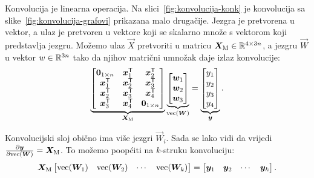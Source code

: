 \documentclass[utf8, diplomski, lmodern]{fer}
\begin{document}
Konvolucija je linearna operacija. Na slici~\ref{fig:konvolucija-konk} je konvolucija sa slike~\ref{fig:konvolucija-grafovi} prikazana malo drugačije. Jezgra je pretvorena u vektor, a ulaz je pretvoren u vektore koji se skalarno množe s vektorom koji predstavlja jezgru. Možemo ulaz $\vec X$ pretvoriti u matricu $\vec X_\text{M}\in\R^{4\times 3n}$, a jezgru $\vec W$ u vektor $w\in\mathbb{R}^{3n}$ tako da njihov matrični umnožak daje izlaz konvolucije:
\begin{align}
\underbrace{
\begin{bmatrix}
\cvec 0_{1\times n} & \vec x_1^\tp & \vec x_2^\tp \\
       \vec x_1^\tp & \vec x_2^\tp & \vec x_3^\tp \\
       \vec x_2^\tp & \vec x_3^\tp & \vec x_4^\tp \\
       \vec x_3^\tp & \vec x_4^\tp & \cvec 0_{1\times n}         
\end{bmatrix}
}_{\vec X_{\text{M}}}
\underbrace{
\begin{bmatrix}
\vec w_1 \\
\vec w_2 \\
\vec w_3     
\end{bmatrix}
}_{\vecfunc(\vec W)}
=
\underbrace{
\begin{bmatrix}
y_1 \\ y_2 \\ y_3 \\y_4     
\end{bmatrix}
}_{\vec y}
\text{.}
\end{align}

Konvolucijski sloj obično ima više jezgri $\vec W_i$. Sada se lako vidi da vrijedi $\pd{\vec y}{\vecfunc(\vec W)}=\vec X_\text{M}$. To možemo poopćiti na $k$-struku konvoluciju:
\begin{align}
\vec X_\text{M}
\begin{bmatrix}
\vecfunc(\vec W_1) & \vecfunc(\vec W_2) & \cdots & \vecfunc(\vec W_k)
\end{bmatrix}
= 
\begin{bmatrix}
\vec y_1 & \vec y_2 & \cdots & \vec y_k \\
\end{bmatrix}
\text{.}
\end{align}
\end{document}
